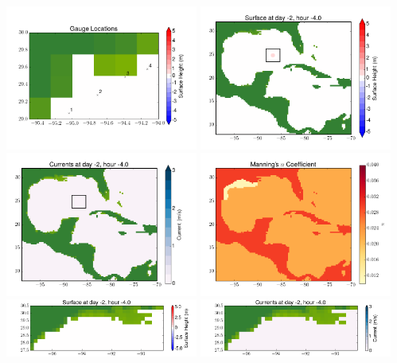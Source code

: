 \documentclass[11pt]{article}
\begin{document}
\includegraphics[width=0.475\textwidth]{frame0019fig10.png}
\vskip 10pt 
\includegraphics[width=0.475\textwidth]{frame0020fig1.png}
\includegraphics[width=0.475\textwidth]{frame0020fig2.png}
\vskip 10pt 
\includegraphics[width=0.475\textwidth]{frame0020fig3.png}
\includegraphics[width=0.475\textwidth]{frame0020fig4.png}
\vskip 10pt 
\includegraphics[width=0.475\textwidth]{frame0020fig5.png}
\end{document}
